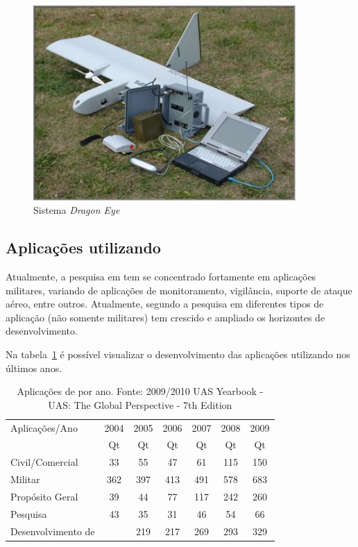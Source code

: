 \begin{figure}[h!]
\centering
\includegraphics[width=10cm]{pictures/dragon_eye_system.jpg}
\caption{Sistema \emph{Dragon Eye} }
 \label{fig:dragon_eye}
\end{figure}




\subsection{Aplicações utilizando \vants}
Atualmente, a pesquisa em \vants tem se concentrado fortamente em aplicações militares, variando de aplicações de monitoramento, vigilância, suporte de ataque aéreo, entre outros. Atualmente, segundo \cite{Valavanis2007} a pesquisa em diferentes tipos de aplicação (não somente militares) tem crescido e ampliado os horizontes de desenvolvimento.

Na tabela~\ref{tbl:vants_por_ano} é possível visualizar o desenvolvimento das aplicações utilizando \vants nos últimos anos.


\begin{table}[h!]
\centering
	\begin{tabular}{| l | c | c | c | c | c | c |}
		\hline
		Aplicações/Ano & 2004 & 2005 & 2006 & 2007 & 2008 & 2009 \\
		\cline{2-7}
		 & Qt & Qt & Qt & Qt & Qt & Qt  \\
		\hline
		Civil/Comercial  & 33 &  55  & 47  & 61  & 115  & 150 \\
		Militar  & 362  & 397  & 413  & 491  & 578  & 683 \\
		Propósito Geral &  39  & 44  & 77  & 117  & 242  & 260 \\
		Pesquisa  & 43  & 35  & 31  & 46  & 54  & 66 \\
		Desenvolvimento de \vants &   & 219  & 217  & 269  & 293  & 329 \\
		\hline
	\end{tabular}

	\caption{Aplicações de \vants por ano. Fonte: 2009/2010 UAS Yearbook - UAS: The Global Perspective - 7th Edition}
	\label{tbl:vants_por_ano}
\end{table}

